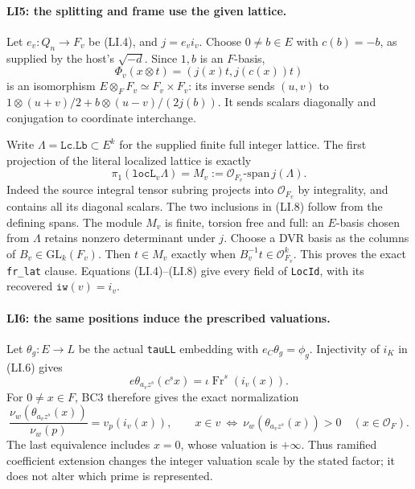\documentclass[11pt,a4paper]{article}
\numberwithin{equation}{section}
\theoremstyle{remark}\newtheorem{remark}[theorem]{Remark}
\begin{document}
\paragraph{LI5: the splitting and frame use the given lattice.}
Let $e_v:Q_n\to F_v$ be (LI.4), and $j=e_vi_v$. Choose
$0\ne b\in E$ with $c(b)=-b$, as supplied by the host's
$\sqrt{-d}$. Since $1,b$ is an $F$-basis,
\[
 \Phi_v(x\otimes t)=(j(x)t,j(c(x))t)                    \tag{LI.7}
\]
is an isomorphism $E\otimes_FF_v\simeq F_v\times F_v$:
its inverse sends $(u,v)$ to
$1\otimes(u+v)/2+b\otimes(u-v)/(2j(b))$.
It sends scalars diagonally and conjugation to coordinate interchange.

Write $\Lambda=\texttt{Lc.Lb}\subset E^k$ for the supplied finite
full integer lattice. The first projection of the literal localized
lattice is exactly
\[
 \pi_1(\texttt{locL}_v\Lambda)
   =M_v:=\mathcal O_{F_v}\text{-span}\,j(\Lambda).        \tag{LI.8}
\]
Indeed the source integral tensor subring projects into
$\mathcal O_{F_v}$ by integrality, and contains all its diagonal
scalars. The two inclusions in (LI.8) follow from the defining spans.
The module $M_v$ is finite, torsion free and full: an $E$-basis chosen
from $\Lambda$ retains nonzero determinant under $j$.
Choose a DVR basis as the columns of $B_v\in\mathrm{GL}_k(F_v)$.
Then $t\in M_v$ exactly when $B_v^{-1}t\in\mathcal O_{F_v}^k$.
This proves the exact \texttt{fr\_lat} clause. Equations (LI.4)--(LI.8)
give every field of \texttt{LocId}, with its recovered
$\texttt{iw}(v)=i_v$.

\paragraph{LI6: the same positions induce the prescribed valuations.}
Let $\theta_g:E\to L$ be the actual \texttt{tauLL} embedding with
$e_C\theta_g=\phi_g$. Injectivity of $i_K$ in (LI.6) gives
\[
 e\theta_{a_vz^s}(c^sx)=\iota\operatorname{Fr}^s(i_v(x)).
                                                               \tag{LI.9}
\]
For $0\ne x\in F$, BC3 therefore gives the exact normalization
\[
 \frac{\nu_w(\theta_{a_vz^s}(x))}{\nu_w(p)}=v_p(i_v(x)),
 \qquad
 x\in v\ \Longleftrightarrow\
 \nu_w(\theta_{a_vz^s}(x))>0\quad(x\in\mathcal O_F).
                                                               \tag{LI.10}
\]
The last equivalence includes $x=0$, whose valuation is $+\infty$.
Thus ramified coefficient extension changes the integer valuation scale
by the stated factor; it does not alter which prime is represented.
\end{document}
